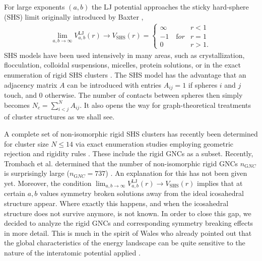 For large exponents $(a,b)$ the LJ potential approaches the sticky hard-sphere
(SHS) limit originally introduced by Baxter \autocite{baxter68,Gazzillo_AnalyticsolutionsBaxter_2004},
\begin{align}
    \lim_{a,b\rightarrow \infty} V_{a,b}^\mathrm{LJ}(r) \rightarrow V_\mathrm{SHS}(r)=
    \begin{cases}
        \infty   & r < 1\\
        -1  \quad {\mathrm for} & r = 1\\
        0       & r > 1.
    \end{cases}
\label{eqn:KS1}
\end{align}
SHS models have been used intensively in many areas, such as crystallization,
flocculation, colloidal suspensions, micelles, protein solutions, or in the
exact enumeration of rigid SHS clusters
\autocite{Stell_Stickyspheresrelated_1991,Jamnik_Spatialcorrelationssolvation_1996,Santos_Radialdistributionfunctions_1998,Gazzillo_AnalyticsolutionsBaxter_2004,Hoy_MinimalEnergyPackings_2010,Arkus_Minimalenergyclusters_2009,Arkus-2010,Arkus_DerivingFiniteSphere_2011,Hoy_Structurefinitesphere_2012,Hayes_ScienceStickySpheres_2012,Holmes-Cerfon_geometricalapproachcomputing_2013,Holmes-Cerfon_EnumeratingRigidSphere_2016,Holmes-Cerfon_StickySphereClusters_2017,Kallus_Freeenergysingular_2017}.
The SHS model has the advantage that an adjacency matrix $A$ can be introduced
with entries $A_{ij}=1$ if spheres $i$ and $j$ touch, and 0 otherwise. The
number of contacts between spheres then simply becomes $N_c=\sum_{i<j}^N
A_{ij}$. It also opens the way for graph-theoretical treatments of cluster
structures as we shall see.

A complete set of non-isomorphic rigid SHS clusters has recently been
determined for cluster size $N \leq 14$ via exact enumeration studies employing
geometric rejection
\autocite{Hoy_Structuredynamicsmodel_2015,Holmes-Cerfon_EnumeratingRigidSphere_2016}
and rigidity rules \autocite{Holmes-Cerfon_StickySphereClusters_2017}. These
include the rigid \acp{GNC} as a subset. Recently, Trombach et al. determined
that the number of non-isomorphic rigid \acp{GNC} $n_{\mathrm GNC}$ is
surprisingly large ($n_{\mathrm GNC}=737$) \autocite{Trombach_stickyhardsphereLennardJonestypeclusters_2018}. An explanation for
this has not been given yet. Moreover, the condition $\lim_{a,b\rightarrow
\infty} V_{a,b}^\mathrm{LJ}(r) \rightarrow V_\mathrm{SHS}(r)$ implies that at
certain $a,b$ values symmetry broken solutions away from the ideal icosahedral
structure appear. Where exactly this happens, and when the icosahedral
structure does not survive anymore, is not known. In order to close this gap,
we decided to analyze the rigid \acp{GNC} and corresponding symmetry breaking
effects in more detail. This is much in the spirit of Wales who already pointed
out that the global characteristics of the energy landscape can be quite
sensitive to the nature of the interatomic potential applied
\autocite{Wales_MicroscopicBasisGlobal_2001}.

